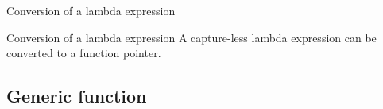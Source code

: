 \begin{frame}{Conversion of a lambda expression}{}
  \begin{block}{Conversion of a lambda expression}
    A capture-less lambda expression can be converted to a function pointer.
  \end{block}

  \begin{example}
  \end{example}
\end{frame}


\subsection{Generic function}

